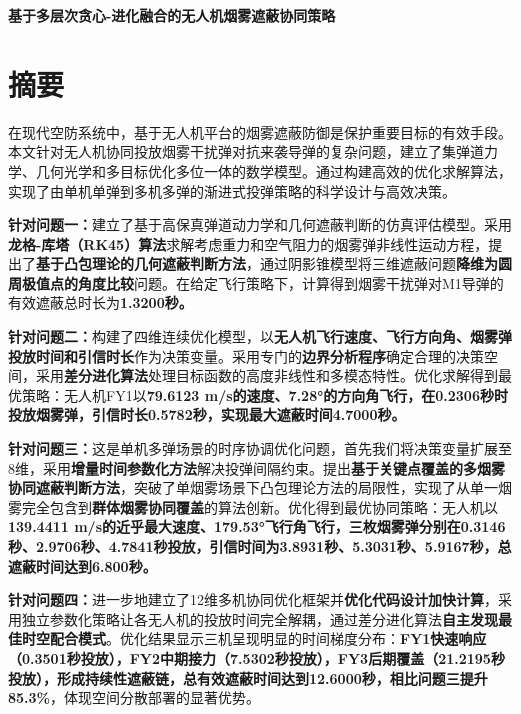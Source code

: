 \documentclass[fontset=SimSun]{ctexart}
\begin{document}
\setcounter{page}{1}
\begin{center}
    {\LARGE \textbf{基于多层次贪心-进化融合的无人机烟雾遮蔽协同策略}} \\[0.5cm]
\end{center}

\vspace{0.5cm}

\section*{摘要}

在现代空防系统中，基于无人机平台的烟雾遮蔽防御是保护重要目标的有效手段。本文针对无人机协同投放烟雾干扰弹对抗来袭导弹的复杂问题，建立了集弹道力学、几何光学和多目标优化多位一体的数学模型。通过构建高效的优化求解算法，实现了由单机单弹到多机多弹的渐进式投弹策略的科学设计与高效决策。

\textbf{针对问题一：}建立了基于高保真弹道动力学和几何遮蔽判断的仿真评估模型。采用\textbf{龙格-库塔（RK45）算法}求解考虑重力和空气阻力的烟雾弹非线性运动方程，提出了\textbf{基于凸包理论的几何遮蔽判断方法}，通过阴影锥模型将三维遮蔽问题\textbf{降维为圆周极值点的角度比较}问题。在给定飞行策略下，计算得到烟雾干扰弹对M1导弹的有效遮蔽总时长为\textbf{1.3200秒。}

\textbf{针对问题二：}构建了四维连续优化模型，以\textbf{无人机飞行速度、飞行方向角、烟雾弹投放时间和引信时长}作为决策变量。采用专门的\textbf{边界分析程序}确定合理的决策空间，采用\textbf{差分进化算法}处理目标函数的高度非线性和多模态特性。优化求解得到最优策略：无人机FY1以\textbf{79.6123 m/s的速度、7.28°的方向角飞行，在0.2306秒时投放烟雾弹，引信时长0.5782秒，实现最大遮蔽时间4.7000秒。}

\textbf{针对问题三：}这是单机多弹场景的时序协调优化问题，首先我们将决策变量扩展至8维，采用\textbf{增量时间参数化方法}解决投弹间隔约束。提出\textbf{基于关键点覆盖的多烟雾协同遮蔽判断方法}，突破了单烟雾场景下凸包理论方法的局限性，实现了从单一烟雾完全包含到\textbf{群体烟雾协同覆盖}的算法创新。优化得到最优协同策略：无人机以\textbf{139.4411 m/s的近乎最大速度、179.53°飞行角飞行，三枚烟雾弹分别在0.3146秒、2.9706秒、4.7841秒投放，引信时间为3.8931秒、5.3031秒、5.9167秒，总遮蔽时间达到6.800秒。}

\textbf{针对问题四：}进一步地建立了12维多机协同优化框架并\textbf{优化代码设计加快计算}，采用独立参数化策略让各无人机的投放时间完全解耦，通过差分进化算法\textbf{自主发现最佳时空配合模式}。优化结果显示三机呈现明显的时间梯度分布：\textbf{FY1快速响应（0.3501秒投放），FY2中期接力（7.5302秒投放），FY3后期覆盖（21.2195秒投放），形成持续性遮蔽链，总有效遮蔽时间达到12.6000秒，相比问题三提升85.3\%}，体现空间分散部署的显著优势。
\end{document}
